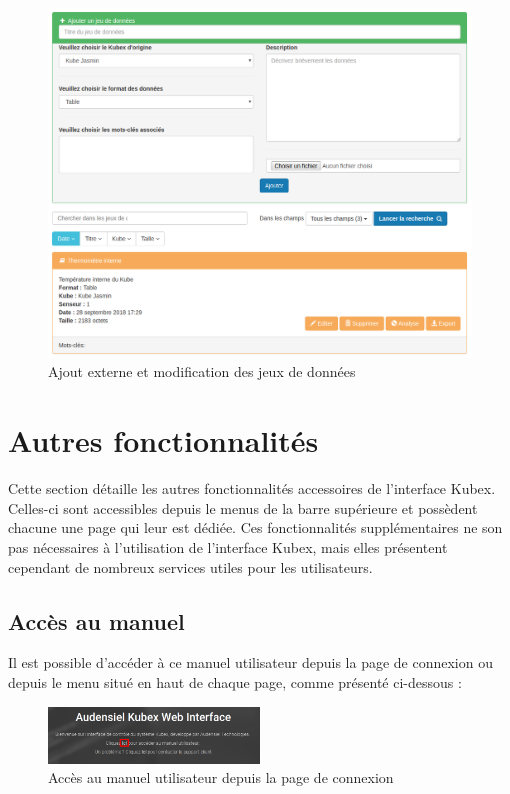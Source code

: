\documentclass[a4paper]{report}
\begin{document}
\begin{figure}[h!]
	\includegraphics[width=\textwidth]{images/datasets.png}
	\caption{\label{fig:datasets} Ajout externe et modification des jeux de données}
\end{figure}
\newpage
\section{Autres fonctionnalités}

Cette section détaille les autres fonctionnalités accessoires de l'interface Kubex. Celles-ci sont accessibles depuis le menus de la barre supérieure et possèdent chacune une page qui leur est dédiée. Ces fonctionnalités supplémentaires ne son pas nécessaires à l'utilisation de l'interface Kubex, mais elles présentent cependant de nombreux services utiles pour les utilisateurs.

\subsection{Accès au manuel}
\label{subsec:manual}

Il est possible d'accéder à ce manuel utilisateur depuis la page de connexion ou depuis le menu situé en haut de chaque page, comme présenté ci-dessous :

\begin{figure}[h!]
	\centering
	\includegraphics[width=0.5\textwidth]{images/loginManual.png}
	\caption{\label{fig:manual} Accès au manuel utilisateur depuis la page de connexion}
\end{figure}
\end{document}
